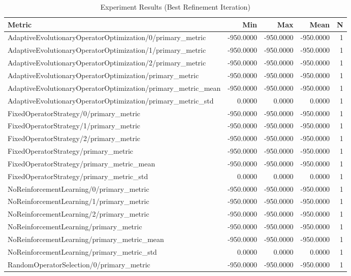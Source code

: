 \begin{table}[h]
\centering
\caption{Experiment Results (Best Refinement Iteration)}
\begin{tabular}{lrrrr}
\hline
Metric & Min & Max & Mean & N \\
\hline
AdaptiveEvolutionaryOperatorOptimization/0/primary_metric & -950.0000 & -950.0000 & -950.0000 & 1 \\
AdaptiveEvolutionaryOperatorOptimization/1/primary_metric & -950.0000 & -950.0000 & -950.0000 & 1 \\
AdaptiveEvolutionaryOperatorOptimization/2/primary_metric & -950.0000 & -950.0000 & -950.0000 & 1 \\
AdaptiveEvolutionaryOperatorOptimization/primary_metric & -950.0000 & -950.0000 & -950.0000 & 1 \\
AdaptiveEvolutionaryOperatorOptimization/primary_metric_mean & -950.0000 & -950.0000 & -950.0000 & 1 \\
AdaptiveEvolutionaryOperatorOptimization/primary_metric_std & 0.0000 & 0.0000 & 0.0000 & 1 \\
FixedOperatorStrategy/0/primary_metric & -950.0000 & -950.0000 & -950.0000 & 1 \\
FixedOperatorStrategy/1/primary_metric & -950.0000 & -950.0000 & -950.0000 & 1 \\
FixedOperatorStrategy/2/primary_metric & -950.0000 & -950.0000 & -950.0000 & 1 \\
FixedOperatorStrategy/primary_metric & -950.0000 & -950.0000 & -950.0000 & 1 \\
FixedOperatorStrategy/primary_metric_mean & -950.0000 & -950.0000 & -950.0000 & 1 \\
FixedOperatorStrategy/primary_metric_std & 0.0000 & 0.0000 & 0.0000 & 1 \\
NoReinforcementLearning/0/primary_metric & -950.0000 & -950.0000 & -950.0000 & 1 \\
NoReinforcementLearning/1/primary_metric & -950.0000 & -950.0000 & -950.0000 & 1 \\
NoReinforcementLearning/2/primary_metric & -950.0000 & -950.0000 & -950.0000 & 1 \\
NoReinforcementLearning/primary_metric & -950.0000 & -950.0000 & -950.0000 & 1 \\
NoReinforcementLearning/primary_metric_mean & -950.0000 & -950.0000 & -950.0000 & 1 \\
NoReinforcementLearning/primary_metric_std & 0.0000 & 0.0000 & 0.0000 & 1 \\
RandomOperatorSelection/0/primary_metric & -950.0000 & -950.0000 & -950.0000 & 1 \\

\end{tabular}
\end{table}
